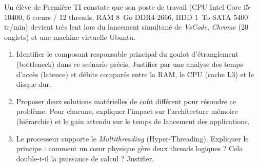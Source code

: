 \documentclass[11pt]{article}
\begin{document}
\begin{exercice}
Un élève de Première TI constate que son poste de travail (CPU Intel Core i5-10400, 6 cœurs / 12 threads, RAM 8~Go DDR4-2666, HDD 1~To SATA 5400 tr/min) devient très lent lors du lancement simultané de \textit{VsCode}, \textit{Chrome} (20 onglets) et une machine virtuelle Ubuntu.
\begin{enumerate}
    \item Identifier le composant responsable principal du goulot d'étranglement (bottleneck) dans ce scénario précis. Justifier par une analyse des temps d'accès (latence) et débits comparés entre la RAM, le CPU (cache L3) et le disque dur.
    \item Proposer deux solutions matérielles de coût différent pour résoudre ce problème. Pour chacune, expliquer l'impact sur l'architecture mémoire (hiérarchie) et le gain attendu sur le temps de lancement des applications.
    \item Le processeur supporte le \textit{Multithreading} (Hyper-Threading). Expliquer le principe : comment un cœur physique gère deux threads logiques ? Cela double-t-il la puissance de calcul ? Justifier.
\end{enumerate}
\end{exercice}
\end{document}
